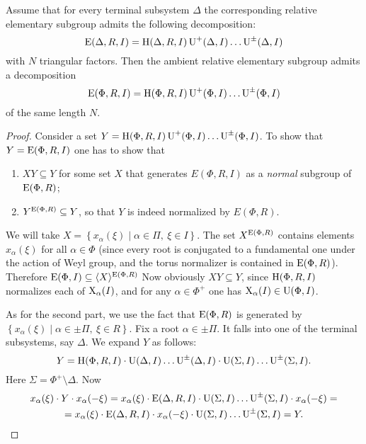 \begin{thm}\label{thm:Gauss}
Assume that for every terminal subsystem $\Delta$ the corresponding relative elementary subgroup admits the following decomposition:
\[ \operatorname{E}(\Delta,R,I)=\operatorname{H}(\Delta,R,I)\operatorname{U}^+(\Delta,I)\ldots\operatorname{U}^\pm(\Delta,I) \]
with $N$ triangular factors. Then the ambient relative elementary subgroup admits a decomposition
\[ \operatorname{E}(\Phi,R,I)=\operatorname{H}(\Phi,R,I)\operatorname{U}^+(\Phi,I)\ldots\operatorname{U}^\pm(\Phi,I) \]
of the same length $N$.
\end{thm}
\begin{proof}
Consider a set $Y=\operatorname{H}(\Phi,R,I)\operatorname{U}^+(\Phi,I)\ldots\operatorname{U}^\pm(\Phi,I)$. To show that $Y=\operatorname{E}(\Phi,R,I)$ one has to show that
\begin{enumerate}
\item $XY\subseteq Y$ for some set $X$ that generates $E(\Phi,R,I)$ as a \emph{normal} subgroup of $\operatorname{E}(\Phi,R)$;
\item $Y^{\operatorname{E}(\Phi,R)}\subseteq Y$, so that $Y$ is indeed normalized by $E(\Phi,R)$.
\end{enumerate}
We will take $X=\left\{x_\alpha(\xi)\mid\alpha\in\Pi,\ \xi\in I \right\}$. The set $X^{\operatorname{E}(\Phi,R)}$ contains elements $x_\alpha(\xi)$ for all $\alpha\in\Phi$ (since every root is conjugated to a fundamental one under the action of Weyl group, and the torus normalizer is contained in $\operatorname{E}(\Phi,R)$). Therefore $\operatorname{E}(\Phi,I)\subseteq\langle X\rangle^{\operatorname{E}(\Phi,R)}$ Now obviously $XY\subseteq Y$, since $\operatorname{H}(\Phi,R,I)$ normalizes each of $\operatorname{X}_\alpha(I)$, and for any $\alpha\in\Phi^+$ one has $\operatorname{X}_\alpha(I)\in\operatorname{U}(\Phi,I)$.

As for the second part, we use the fact that $\operatorname{E}(\Phi,R)$ is generated by $\left\{x_\alpha(\xi)\mid\alpha\in\pm\Pi,\ \xi\in R\right\}$. Fix a root $\alpha\in\pm\Pi$. It falls into one of the terminal subsystems, say $\Delta$. We expand $Y$ as follows:
\[ Y=\operatorname{H}(\Phi,R,I)\cdot\operatorname{U}(\Delta,I)\ldots\operatorname{U}^\pm(\Delta,I)\cdot\operatorname{U}(\Sigma,I)\ldots\operatorname{U}^\pm(\Sigma,I). \]
Here $\Sigma=\Phi^+\setminus\Delta$. Now
\begin{multline*}
x_\alpha(\xi)\cdot Y\cdot x_\alpha(-\xi) = x_\alpha(\xi)\cdot\operatorname{E}(\Delta,R,I)\cdot\operatorname{U}(\Sigma,I)\ldots\operatorname{U}^\pm(\Sigma,I)\cdot x_\alpha(-\xi) =\\
= x_\alpha(\xi)\cdot\operatorname{E}(\Delta,R,I)\cdot x_\alpha(-\xi)\cdot\operatorname{U}(\Sigma,I)\ldots\operatorname{U}^\pm(\Sigma,I) = Y.\qedhere
\end{multline*}
\end{proof}